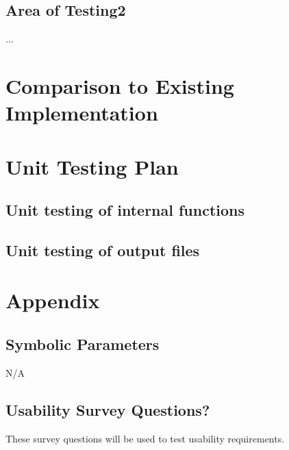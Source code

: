\documentclass[12pt, titlepage]{article}
\begin{document}
\subsection{Area of Testing2}

...

	
\section{Comparison to Existing Implementation}	
				
\section{Unit Testing Plan}
		
\subsection{Unit testing of internal functions}
		
\subsection{Unit testing of output files}		





\newpage

\section{Appendix}

\subsection{Symbolic Parameters}

N/A

\subsection{Usability Survey Questions?}

These survey questions will be used to test usability requirements.
\end{document}
